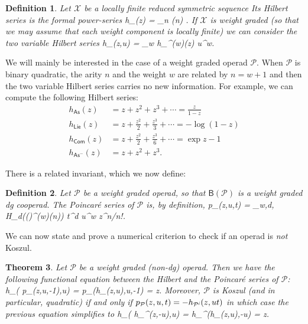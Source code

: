\documentclass[fleqn, a4paper, twoside]{article}
\makeatletter
\newcommand{\eantishriek}{\emph{\text{\raisebox{\depth}{\textexclamdown}}}}
\newcommand{\0}{\langle 0\rangle}
\newcommand{\XX}{\mathcal{X}}
\newcommand{\B}[1]{\mathsf{B}(#1)}
\let\[\@undefined
\DeclareRobustCommand{\[}{\begin{equation}}%
\let\]\@undefined
\DeclareRobustCommand{\]}{\end{equation}}%
\theoremstyle{mytheorem}
\newtheorem{theorem}{Theorem}[section]
\theoremstyle{introthm}
\theoremstyle{mydefinition}
\newtheorem{definition}[theorem]{Definition}
\theoremstyle{mydefinition2}
\theoremstyle{plain} %
\newcommand{\As}{\mathsf{As}}
\newcommand{\Com}{\mathsf{Com}}
\newcommand{\Lie}{\mathsf{Lie}}
\newcommand{\?}{\,?\,}
\newcommand{\PP}{{\mathcal{P}}}
\theoremstyle{mytheorem}
\theoremstyle{plain} %
\makeatother
\begin{document}
\begin{definition}
Let $\XX$ be a locally finite reduced symmetric sequence
Its \emph{Hilbert series} is the formal power-series
\[
h_\XX(z) = \sum_{n} \dim \XX(n) .
\]
If $\XX$ is weight graded (so that we may assume that each
weight component is locally finite) we can consider the two
variable Hilbert series
 \[
h_\XX(z,u) = \sum_{w} h_{\XX^{(w)}}(z) u^w.
\]
\end{definition}

We will mainly be interested in the case of a weight graded operad $\PP$.
When $\PP$ is binary quadratic, the arity $n$ and the weight $w$ are related
by $n = w+1$ and then the two variable Hilbert series carries no new information.
For example, we can compute the following Hilbert series:
\begin{align*}
h_{\As}(z) &=  z + z^2 + z^3 + \cdots = \frac{z}{1-z} \\
h_{\Lie}(z) &=  z + \frac {z^2}2 + \frac{z^3} 3 + \cdots =-\log(1-z) \\
h_{\Com}(z) &=  z + \frac {z^2}2 + \frac{z^3} 6  + \cdots = \exp z -1 \\
h_{\As^-}(z) &=  z +  {z^2} + z^3.
\end{align*}


There is a related invariant, which we now define:
\begin{definition} Let $\PP$ be a weight graded operad, so that
$\B{\PP}$ is a weight graded dg cooperad. The Poincar\'e series
of $\PP$ is, by definition,
\[
p_{\PP}(z,u,t) = \sum_{w,d,} \dim H_d(\B{\PP}^{(w)}(n)) t^d u^w z^n/n!.
\]
\end{definition}

We can now state and prove a numerical criterion to check if an
operad is \emph{not} Koszul.

\begin{theorem}
Let $\PP$ be a weight graded (non-dg) operad. Then we have the following
functional equation between the Hilbert and the Poincar\'e series of $\PP$:
\[
h_\PP( p_\PP(z,u,-1),u) = p_\PP(h_\PP(z,u),u,-1) = z. \]
Moreover, $\PP$ is Koszul (and in particular, quadratic) if and only
if $p_\PP(z,u,t) = -h_{\PP^\eantishriek}(z,ut)$ in which case the previous
equation simplifies to
\[
h_\PP( h_{\PP^\eantishriek}(z,-u),u) = h_{\PP^\eantishriek}(h_\PP(z,u),-u) = z. 
\]
\end{theorem}
\end{document}
